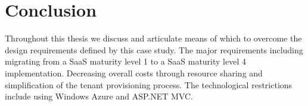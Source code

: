 \section{Conclusion}

Throughout this thesis we discuss and articulate means of which to overcome the design requirements defined by this case study. The major requirements including migrating from a SaaS maturity level 1 to a SaaS maturity level 4 implementation. Decreasing overall costs through resource sharing and simplification of the tenant provisioning process. The technological restrictions include using Windows Azure and ASP.NET MVC.